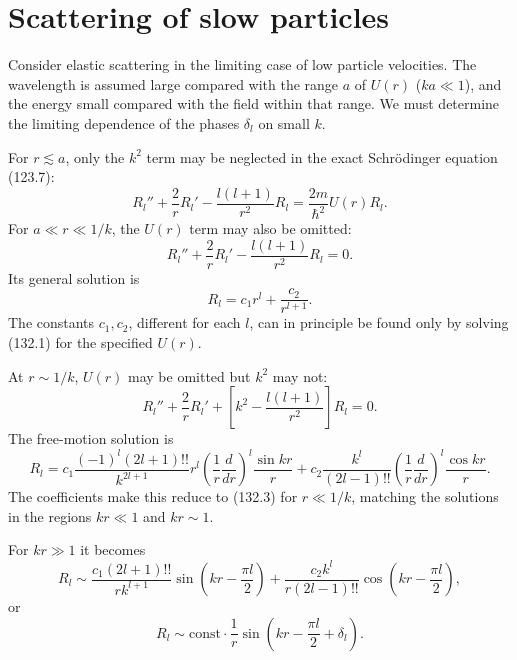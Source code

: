 \section{Scattering of slow particles}

Consider elastic scattering in the limiting case of low particle velocities.
The wavelength is assumed large compared with the range $a$ of $U(r)$
($ka\ll1$), and the energy small compared with the field within that range.
We must determine the limiting dependence of the phases $\delta_l$ on small
$k$.

For $r\lesssim a$, only the $k^2$ term may be neglected in the exact
Schrödinger equation (123.7):
\begin{equation}
 R_l''+\frac2rR_l'-\frac{l(l+1)}{r^2}R_l
 =\frac{2m}{\hbar^2}U(r)R_l. \tag{132.1}
\end{equation}
For $a\ll r\ll1/k$, the $U(r)$ term may also be omitted:
\begin{equation}
 R_l''+\frac2rR_l'-\frac{l(l+1)}{r^2}R_l=0. \tag{132.2}
\end{equation}
Its general solution is
\begin{equation}
 R_l=c_1r^l+\frac{c_2}{r^{l+1}}. \tag{132.3}
\end{equation}
The constants $c_1,c_2$, different for each $l$, can in principle be found
only by solving (132.1) for the specified $U(r)$.

At $r\sim1/k$, $U(r)$ may be omitted but $k^2$ may not:
\begin{equation}
 R_l''+\frac2rR_l'+\left[k^2-\frac{l(l+1)}{r^2}\right]R_l=0. \tag{132.4}
\end{equation}
The free-motion solution is
\begin{equation}
 R_l=c_1\frac{(-1)^l(2l+1)!!}{k^{2l+1}}r^l
 \left(\frac1r\frac d{dr}\right)^l\frac{\sin kr}{r}
 +c_2\frac{k^l}{(2l-1)!!}
 \left(\frac1r\frac d{dr}\right)^l\frac{\cos kr}{r}. \tag{132.5}
\end{equation}
The coefficients make this reduce to (132.3) for $r\ll1/k$, matching the
solutions in the regions $kr\ll1$ and $kr\sim1$.

For $kr\gg1$ it becomes
\[
 R_l\sim\frac{c_1(2l+1)!!}{rk^{l+1}}\sin\left(kr-\frac{\pi l}2\right)
 +\frac{c_2k^l}{r(2l-1)!!}\cos\left(kr-\frac{\pi l}2\right),
\]
or
\begin{equation}
 R_l\sim\mathrm{const}\cdot\frac1r
 \sin\left(kr-\frac{\pi l}2+\delta_l\right). \tag{132.6}
\end{equation}

